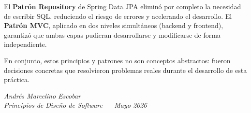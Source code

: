\documentclass[12pt,a4paper]{article}
\begin{document}
El \textbf{Patrón Repository} de Spring Data JPA eliminó por completo la necesidad de escribir SQL, reduciendo el riesgo de errores y acelerando el desarrollo. El \textbf{Patrón MVC}, aplicado en dos niveles simultáneos (backend y frontend), garantizó que ambas capas pudieran desarrollarse y modificarse de forma independiente.

En conjunto, estos principios y patrones no son conceptos abstractos: fueron decisiones concretas que resolvieron problemas reales durante el desarrollo de esta práctica.

\vspace{1cm}
\begin{flushright}
\textit{Andrés Marcelino Escobar}\\
\textit{Principios de Diseño de Software --- Mayo 2026}
\end{flushright}
\end{document}
